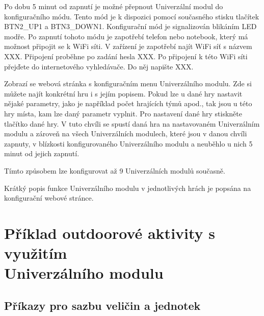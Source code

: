 Po dobu 5 minut od zapnutí je možné přepnout Univerzální modul do konfiguračního módu. Tento mód je k dispozici pomocí současného stisku tlačítek BTN2\_UP1 a BTN3\_DOWN1. Konfigurační mód je signalizován blikáním LED modře. 
Po zapnutí tohoto módu je zapotřebí telefon 
nebo notebook, který má možnost připojit se k WiFi síti. V zařízení je zapotřebí najít WiFi síť s názvem XXX. Připojení proběhne po zadání hesla XXX. Po připojení k této WiFi síti přejďete do internetového 
vyhledávače. Do něj napište XXX. 

Zobrazí se webová stránka s konfiguračním menu Univerzálního modulu. Zde si můžete najít konkrétní hru i s jejím popisem. Pokud lze u dané hry nastavit nějaké parametry, jako je například počet hrajících týmů apod., tak 
jsou u této hry místa, kam lze daný parametr vyplnit. Pro nastavení dané hry stiskněte tlačítko dané hry. V tuto chvíli se spustí daná hra na nastavovaném Univerzálním modulu a zároveň na všech Univerzálních modulech, 
které jsou v danou chvíli zapnuty, v blízkosti konfigurovaného Univerzálního modulu a neuběhlo u nich 5 minut od jejich zapnutí. 

Tímto způsobem lze konfigurovat až 9 Univerzálních modulů současně. 

Krátký popis funkce Univerzálního modulu v jednotlivých hrách je popsána na konfigurační webové stránce. 

\chapter{Příklad outdoorové aktivity s využitím \\Univerzálního modulu}


\iffalse
\section{Příkazy pro sazbu veličin a jednotek}

